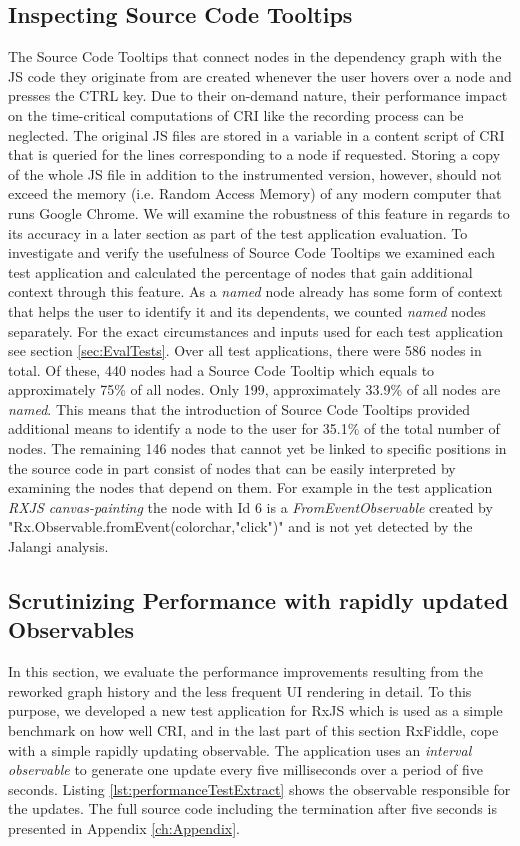 	\subsection{Inspecting Source Code Tooltips}
	The Source Code Tooltips that connect nodes in the dependency graph with the JS code they originate from are created whenever the user hovers over a node and presses the CTRL key. Due to their on-demand nature, their performance impact on the time-critical computations of CRI like the recording process can be neglected. The original JS files are stored in a variable in a content script of CRI that is queried for the lines corresponding to a node if requested. Storing a copy of the whole JS file in addition to the instrumented version, however, should not exceed the memory (i.e. Random Access Memory) of any modern computer that runs Google Chrome. We will examine the robustness of this feature in regards to its accuracy in a later section as part of the test application evaluation. To investigate and verify the usefulness of Source Code Tooltips we examined each test application and calculated the percentage of nodes that gain additional context through this feature. As a \emph{named} node already has some form of context that helps the user to identify it and its dependents, we counted \emph{named} nodes separately. For the exact circumstances and inputs used for each test application see section \ref{sec:EvalTests}. %
	 Over all test applications, there were 586 nodes in total. Of these, 440 nodes had a Source Code Tooltip which equals to approximately 75\% of all nodes. Only 199, approximately 33.9\% of all nodes are \emph{named}. This means that the introduction of Source Code Tooltips provided additional means to identify a node to the user for 35.1\% of the total number of nodes. The remaining 146 nodes that cannot yet be linked to specific positions in the source code in part consist of nodes that can be easily interpreted by examining the nodes that depend on them. For example in the test application \emph{RXJS canvas-painting} the node with Id 6 is a \emph{FromEventObservable} created by "Rx.Observable.fromEvent(colorchar,"click")" and is not yet detected by the Jalangi analysis.

	\subsection{Scrutinizing Performance with rapidly updated Observables}
	\label{sec:PerformanceEvaluation}
	In this section, we evaluate the performance improvements resulting from the reworked graph history and the less frequent UI rendering in detail. To this purpose, we developed a new test application for RxJS which is used as a simple benchmark on how well CRI, and in the last part of this section RxFiddle, cope with a simple rapidly updating observable. The application uses an \emph{interval observable} to generate one update every five milliseconds over a period of five seconds. Listing \ref{lst:performanceTestExtract} shows the observable responsible for the updates. The full source code including the termination after five seconds is presented in Appendix \ref{ch:Appendix}.
	
